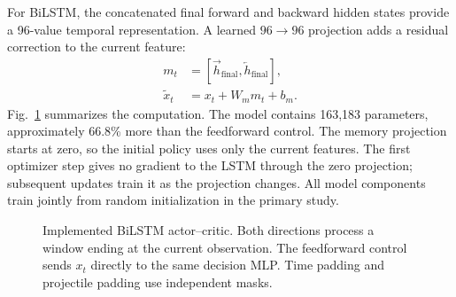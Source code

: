 \documentclass[conference]{IEEEtran}
\newcommand{\R}{\mathbb{R}}
\begin{document}
For BiLSTM, the concatenated final forward and backward hidden states provide a 96-value temporal representation. A learned $96\to96$ projection adds a residual correction to the current feature:
\begin{align}
m_t &= [\overrightarrow{h}_{\mathrm{final}},\overleftarrow{h}_{\mathrm{final}}],\\
\widetilde{x}_t &= x_t+W_m m_t+b_m.
\label{eq:residual}
\end{align}
Fig.~\ref{fig:architecture} summarizes the computation. The model contains 163,183 parameters, approximately 66.8\% more than the feedforward control. The memory projection starts at zero, so the initial policy uses only the current features. The first optimizer step gives no gradient to the LSTM through the zero projection; subsequent updates train it as the projection changes. All model components train jointly from random initialization in the primary study.

\begin{figure}[t]
\centering
{}
\caption{Implemented BiLSTM actor--critic. Both directions process a window ending at the current observation. The feedforward control sends $x_t$ directly to the same decision MLP. Time padding and projectile padding use independent masks.}
\label{fig:architecture}
\end{figure}
\end{document}
